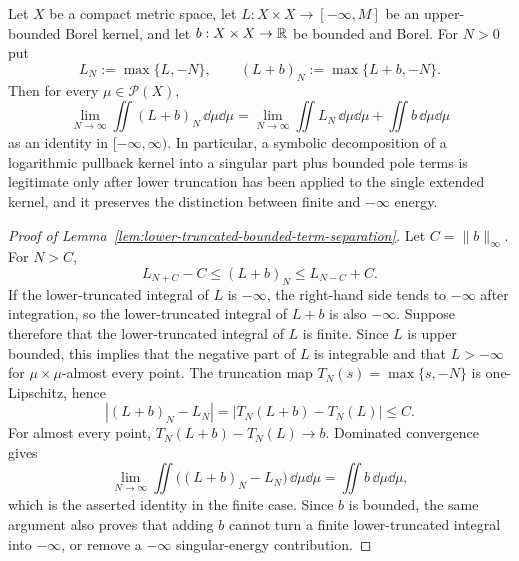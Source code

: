 \begin{lemma}\label{lem:lower-truncated-bounded-term-separation}
Let \(X\) be a compact metric space, let \(L:X\times X\to[-\infty,M]\) be an upper-bounded Borel kernel, and let \(b:X\times X\to\mathbb{R}\) be bounded and Borel.  For \(N>0\) put
\[
L_N:=\max\{L,-N\},
\qquad
(L+b)_N:=\max\{L+b,-N\}.
\]
Then for every \(\mu\in\mathcal P(X)\),
\[
\lim_{N\to\infty}\iint (L+b)_N\,\dd\mu\dd\mu
=
\lim_{N\to\infty}\iint L_N\,\dd\mu\dd\mu
+
\iint b\,\dd\mu\dd\mu
\]
as an identity in \([-\infty,\infty)\).  In particular, a symbolic decomposition of a logarithmic pullback kernel into a singular part plus bounded pole terms is legitimate only after lower truncation has been applied to the single extended kernel, and it preserves the distinction between finite and \(-\infty\) energy.
\end{lemma}

\begin{proof}[Proof of Lemma~\ref{lem:lower-truncated-bounded-term-separation}]
Let \(C=\|b\|_\infty\).  For \(N>C\),
\[
L_{N+C}-C\le (L+b)_N\le L_{N-C}+C.
\]
If the lower-truncated integral of \(L\) is \(-\infty\), the right-hand side tends to \(-\infty\) after integration, so the lower-truncated integral of \(L+b\) is also \(-\infty\).  Suppose therefore that the lower-truncated integral of \(L\) is finite.  Since \(L\) is upper bounded, this implies that the negative part of \(L\) is integrable and that \(L> -\infty\) for \(\mu\times\mu\)-almost every point.  The truncation map \(T_N(s)=\max\{s,-N\}\) is one-Lipschitz, hence
\[
\left|(L+b)_N-L_N\right|=\left|T_N(L+b)-T_N(L)\right|\le C.
\]
For almost every point, \(T_N(L+b)-T_N(L)\to b\).  Dominated convergence gives
\[
\lim_{N\to\infty}\iint\bigl((L+b)_N-L_N\bigr)\,\dd\mu\dd\mu
=\iint b\,\dd\mu\dd\mu,
\]
which is the asserted identity in the finite case.  Since \(b\) is bounded, the same argument also proves that adding \(b\) cannot turn a finite lower-truncated integral into \(-\infty\), or remove a \(-\infty\) singular-energy contribution.
\end{proof}

